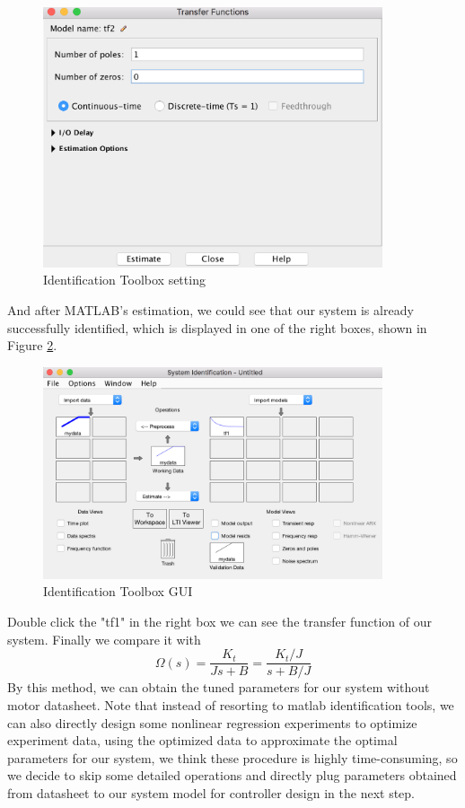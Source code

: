 \documentclass[letterpaper]{article}
\begin{document}
\begin{figure}[H]
\begin{center}
\includegraphics[width = 10cm]{q2_b_2.png}
\caption{Identification Toolbox setting}
\label{q2_b_2}
\end{center}
\end{figure}
And after MATLAB's estimation, we could see that our system is already successfully identified, which is displayed in one of the right boxes, shown in Figure \ref{q2_b_3}.\\
\begin{figure}[H]
\begin{center}
\includegraphics[width = 10cm]{q2_b_3.png}
\caption{Identification Toolbox GUI}
\label{q2_b_3}
\end{center}
\end{figure}
Double click the "tf1" in the right box we can see the transfer function of our system. Finally we compare it with 
$$\Omega (s)=\frac{K_t}{Js+B}=\frac{K_t/J}{s+B/J}$$
By this method, we can obtain the tuned parameters for our system without motor datasheet. Note that instead of resorting to matlab identification tools, we can also directly design some nonlinear regression experiments to optimize experiment data, using the optimized data to approximate the optimal parameters for our system, we think these procedure is highly time-consuming, so we decide to skip some detailed operations and directly plug parameters obtained from datasheet to our system model for controller design in the next step.
\end{document}
